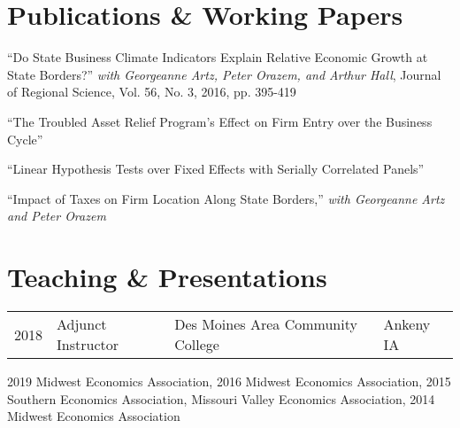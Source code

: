 \documentclass[letterpaper]{article}
\renewenvironment{itemize}{
  \begin{list}{}{
    \setlength{\leftmargin}{0em}
  }
}{
  \end{list}
}
\begin{document}
\section*{Publications \& Working Papers}

\begin{itemize}
\item ``Do State Business Climate Indicators Explain Relative Economic Growth at State Borders?'' \textit{with Georgeanne Artz, Peter Orazem, and Arthur Hall}, Journal of Regional Science, Vol. 56, No. 3, 2016, pp. 395-419
\item ``The Troubled Asset Relief Program's Effect on Firm Entry over the Business Cycle''
\item ``Linear Hypothesis Tests over Fixed Effects with Serially Correlated Panels''
\item ``Impact of Taxes on Firm Location Along State Borders,'' \textit{with Georgeanne Artz and Peter Orazem}
\end{itemize}

\section*{Teaching \& Presentations}
\begin{tabular}{@{}llll}
2018 & Adjunct Instructor & Des Moines Area Community College & Ankeny IA \\
\end{tabular}
\begin{itemize}
\item 2019 Midwest Economics Association, 2016 Midwest Economics Association, 2015 Southern Economics Association, Missouri Valley Economics Association, 2014 Midwest Economics Association
\end{itemize}
\end{document}
